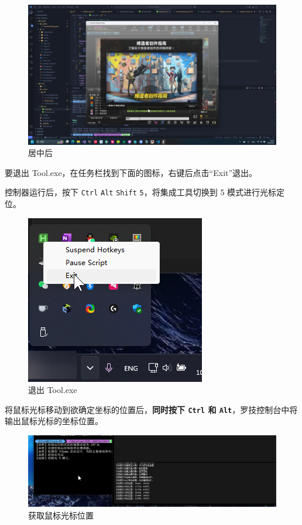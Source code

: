 \begin{figure}[H]
    \Centering
    \includegraphics[width=\textwidth]{assets/after_center.png}
    \caption{居中后}
    \label{ch2fig-after-center}
\end{figure}

要退出 Tool.exe，在任务栏找到下面的图标，右键后点击“Exit”退出。

控制器运行后，按下 \lstinline{Ctrl} \lstinline{Alt} \lstinline{Shift} \lstinline{5}，将集成工具切换到 5 模式进行光标定位。

\begin{figure}[H]
    \Centering
    \includegraphics[width=\textwidth]{assets/exit_tool.png}
    \caption{退出 Tool.exe}
\end{figure}

将鼠标光标移动到欲确定坐标的位置后，\textbf{\color{red}同时按下 \lstinline{Ctrl} 和 \lstinline{Alt}}，罗技控制台中将输出鼠标光标的坐标位置。

\begin{figure}[H]
    \Centering
    \includegraphics[width=\textwidth]{assets/position.png}
    \caption{获取鼠标光标位置}
\end{figure}